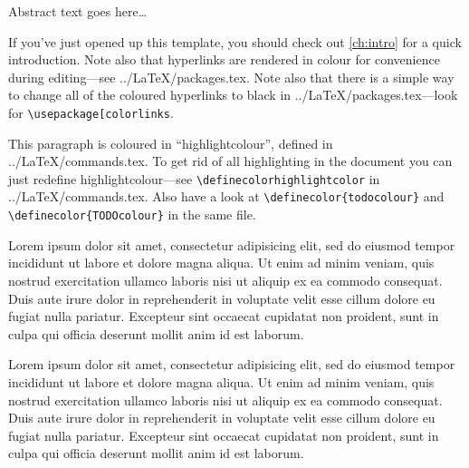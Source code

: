 
\vspace{-2.5em}


\begin{spacing}{1.1}

    Abstract text goes here\dots{}

    If you've just opened up this template, you should check out \autoref{ch:intro} for a quick introduction. Note also that hyperlinks are rendered in colour for convenience during editing---see ../LaTeX/packages.tex. Note also that there is a simple way to change all of the coloured hyperlinks to black in ../LaTeX/packages.tex---look for \texttt{\textbackslash{}usepackage[colorlinks}.

    \textcolor{highlightcolor}{This paragraph is coloured in ``highlightcolour'', defined in ../LaTeX/commands.tex. To get rid of all highlighting in the document you can just redefine highlightcolour---see \texttt{\textbackslash{}definecolor{highlightcolor}} in  ../LaTeX/commands.tex. Also have a look at \texttt{\textbackslash{}definecolor\{todocolour\}} and \texttt{\textbackslash{}definecolor\{TODOcolour\}} in the same file.}
    
    Lorem ipsum dolor sit amet, consectetur adipisicing elit, sed do eiusmod tempor incididunt ut
    labore et dolore magna aliqua. Ut enim ad minim veniam, quis nostrud exercitation ullamco
    laboris nisi ut aliquip ex ea commodo consequat. Duis aute irure dolor in reprehenderit in
    voluptate velit esse cillum dolore eu fugiat nulla pariatur. Excepteur sint occaecat cupidatat
    non proident, sunt in culpa qui officia deserunt mollit anim id est laborum.

    Lorem ipsum dolor sit amet, consectetur adipisicing elit, sed do eiusmod tempor incididunt ut labore
    et dolore magna aliqua. Ut enim ad minim veniam, quis nostrud exercitation ullamco laboris nisi ut
    aliquip ex ea commodo consequat. Duis aute irure dolor in reprehenderit in voluptate velit esse
    cillum dolore eu fugiat nulla pariatur. Excepteur sint occaecat cupidatat non proident, sunt in
    culpa qui officia deserunt mollit anim id est laborum.


\end{spacing}

